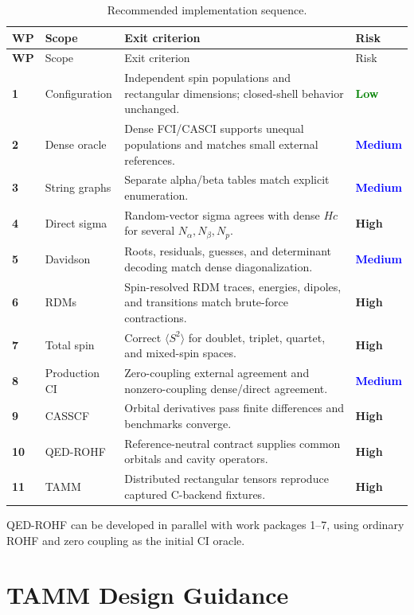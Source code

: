 \documentclass[11pt]{article}
\newcommand{\riskhigh}{\textcolor{amber}{\textbf{High}}}
\newcommand{\riskmed}{\textcolor{blue}{\textbf{Medium}}}
\newcommand{\risklow}{\textcolor{green}{\textbf{Low}}}
\begin{document}
\begin{longtable}{>{\bfseries}p{} p{} p{} p{}}
\caption{Recommended implementation sequence.}\label{tab:wp}\\
\toprule WP & Scope & Exit criterion & Risk \\
\midrule\endfirsthead
\toprule WP & Scope & Exit criterion & Risk \\
\midrule\endhead
1 & Configuration & Independent spin populations and rectangular dimensions;
closed-shell behavior unchanged. & \risklow \\
2 & Dense oracle & Dense FCI/CASCI supports unequal populations and matches
small external references. & \riskmed \\
3 & String graphs & Separate alpha/beta tables match explicit enumeration. &
\riskmed \\
4 & Direct sigma & Random-vector sigma agrees with dense \(Hc\) for several
\(N_\alpha,N_\beta,N_p\). & \riskhigh \\
5 & Davidson & Roots, residuals, guesses, and determinant decoding match dense
diagonalization. & \riskmed \\
6 & RDMs & Spin-resolved RDM traces, energies, dipoles, and transitions match
brute-force contractions. & \riskhigh \\
7 & Total spin & Correct \(\langle S^2\rangle\) for doublet, triplet, quartet,
and mixed-spin spaces. & \riskhigh \\
8 & Production CI & Zero-coupling external agreement and nonzero-coupling
dense/direct agreement. & \riskmed \\
9 & CASSCF & Orbital derivatives pass finite differences and benchmarks
converge. & \riskhigh \\
10 & QED-ROHF & Reference-neutral contract supplies common orbitals and cavity
operators. & \riskhigh \\
11 & TAMM & Distributed rectangular tensors reproduce captured C-backend
fixtures. & \riskhigh \\
\bottomrule
\end{longtable}

QED-ROHF can be developed in parallel with work packages 1--7, using ordinary
ROHF and zero coupling as the initial CI oracle.

\section{TAMM Design Guidance}
\end{document}
